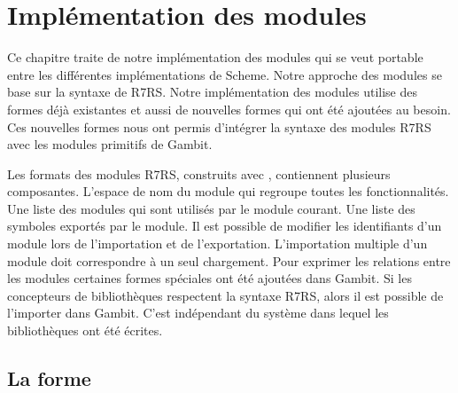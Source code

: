
\chapter{Implémentation des modules}
\label{ch:modules_implementation}

Ce chapitre traite de notre implémentation des modules qui se veut portable
entre les différentes implémentations de Scheme.  Notre approche des modules se
base sur la syntaxe de R7RS.  Notre implémentation des modules utilise des
formes déjà existantes et aussi de nouvelles formes qui ont été ajoutées au
besoin.  Ces nouvelles formes nous ont permis d'intégrer la syntaxe des modules
R7RS avec les modules primitifs de Gambit.

Les formats des modules R7RS, construits avec , contiennent
plusieurs composantes. L'espace de nom du module qui regroupe toutes les
fonctionnalités. Une liste des modules qui sont utilisés par le module courant.
Une liste des symboles exportés par le module. Il est possible de modifier les
identifiants d'un module lors de l'importation et de l'exportation.
L'importation multiple d'un module doit correspondre à un seul chargement.
Pour exprimer les relations entre les modules certaines formes spéciales
ont été ajoutées dans Gambit.  Si les concepteurs de bibliothèques respectent
la syntaxe R7RS, alors il est possible de l'importer dans Gambit. C'est indépendant
du système dans lequel les bibliothèques ont été écrites.





\section{La forme }

